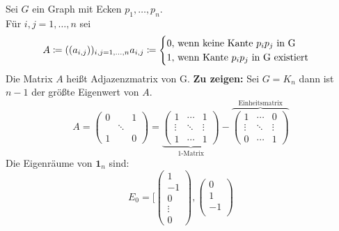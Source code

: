 \begin{problem*}[3]
Sei $ G $ ein Graph mit Ecken $p_1, \dots , p_n$. \\
Für $i,j = 1, \dots , n$ sei 
\begin{equation*}
  A \coloneqq ((a_{ i,j }))_{ i,j = 1,\dots, n } \\
  a_{ i,j } \coloneqq 
  \begin{cases}
  0 , $ wenn keine Kante $ p_ip_j $ in G $ \\
  1 , $ wenn Kante $ p_ip_j $ in G existiert$
  \end{cases}
\end{equation*}
Die Matrix $ A $ heißt Adjazenzmatrix von G.
\textbf{Zu zeigen:} Sei $ G = K_n $ dann ist $ n-1 $ der größte Eigenwert von $ A $.\\
\begin{equation*}
  A = \begin{pmatrix}
  0   &   & 1 \\
  &\ddots & \\
  1   & & 0
  \end{pmatrix} = 
  \underbrace{\begin{pmatrix}
  1 & \cdots & 1 \\
  \vdots & \ddots & \vdots \\
  1   & \cdots & 1
  \end{pmatrix}}_\text{1-Matrix}
   -
  \overbrace{   \begin{pmatrix}
  1 & \cdots & 0 \\
  \vdots & \ddots & \vdots \\
  0   & \cdots & 1
  \end{pmatrix} }^\text{ Einheitsmatrix }
\end{equation*}
Die Eigenräume von $ \textbf{1}_n $ sind:
\begin{equation*}
E_0 = [\begin{pmatrix}
   1 \\
   -1 \\
   0 \\
   \vdots\\
   0
   \end{pmatrix},
   \begin{pmatrix}
   0 \\
   1 \\
   -1 \\

\end{pmatrix}
\end{equation*}
\end{problem*}
